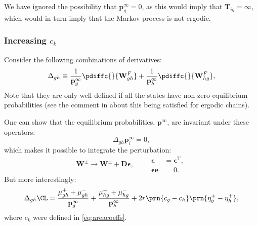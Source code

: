 \documentclass[12pt]{article}
\newcommand{\trans}{^\mathrm{T}}
\newcommand{\onev}{\mathbf{e}}
\newcommand{\eq}{\mathbf{p}^\infty}
\newcommand{\fpt}{\mathbf{T}}
\newcommand{\D}{\mathbf{D}}
\newcommand{\W}{\mathbf{W}}
\begin{document}
We have ignored the possibility that $\eq_g=0$, as this would imply that $\fpt_{ig}=\infty$, which would in turn imply that the Markov process is not ergodic.


\subsubsection{Increasing \texorpdfstring{$c_k$}{c(k)}}\label{sec:areacoeffincr}

Consider the following combinations of derivatives:
%
\begin{align}
\label{eq:areacoeffincrderiv}
    \Delta_{gh} &\equiv
      \frac{1}{\eq_{g}} \pdiffc{}{\W^F_{gh}}
      + \frac{1}{\eq_h} \pdiffc{}{\W^F_{hg}}, \\
\end{align}
%
Note that they are only well defined if all the states have non-zero equilibrium probabilities (see the comment in  about this being satisfied for ergodic chains).

One can show that the equilibrium probabilities, $\eq$, are invariant under these operators:
%
\begin{equation}\label{eq:sareacoeffincrprob}
  \Delta_{gh} \eq_i = 0,
\end{equation}
%
which makes it possible to integrate the perturbation:
%
\begin{equation}\label{eq:areacoeffincrfinite}
  \W^\pm \to \W^\pm + \D\boldsymbol{\epsilon},
  \qquad
  \begin{aligned}
  \boldsymbol{\epsilon} &= \boldsymbol{\epsilon}\trans,
  \\
  \boldsymbol{\epsilon} \onev &= 0.
  \end{aligned}
\end{equation}
%
But more interestingly:
%
\begin{align}
\label{eq:areacoeffincr}
    \Delta_{gh}\CL &=
      \frac{\mu^+_{gh}+\mu^-_{gh}}{\eq_g} + \frac{\mu^+_{hg}+\mu^-_{hg}}{\eq_h}
      + 2r\prn{c_g-c_h}\prn{\eta^+_{g} - \eta^+_{h}},\\
\end{align}
%
where $c_k$ were defined in \eqref{eq:areacoeffs}.
\end{document}
